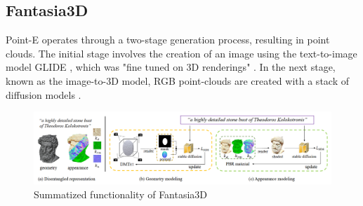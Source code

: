 \subsection{Fantasia3D}
\label{fantasia3D}

Point-E operates through a two-stage generation process, resulting in point clouds. The initial stage involves the creation of an image using the text-to-image model GLIDE \citep{nicholGLIDE}, which was "fine tuned on 3D renderings" \citep{nicholPointE}. In the next stage, known as the image-to-3D model, RGB point-clouds are created with a stack of diffusion models \citep{nicholPointE}.

\begin{figure}[ht]
    \centering
      \includegraphics[width=1\columnwidth]{figures/Fantasia3D.png}
      \caption{Summatized functionality of Fantasia3D}\label{fig:figureFantasia3D}
\end{figure}